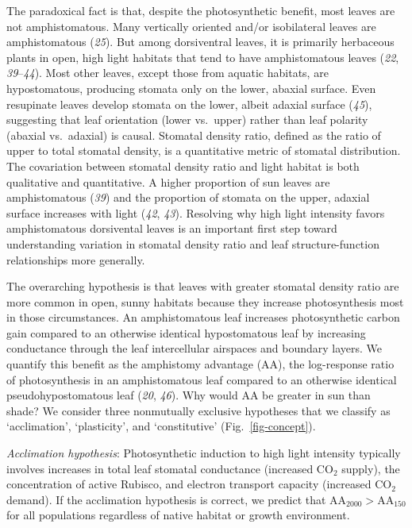 \documentclass[
  letterpaper,
  DIV=11,
  numbers=noendperiod]{scrartcl}
\newcommand{\aahigh}{\mathrm{AA}_{2000}}
\newcommand{\aalow}{\mathrm{AA}_{150}}
\newcommand{\aax}{$\mathrm{AA}$}
\begin{document}
The paradoxical fact is that, despite the photosynthetic benefit, most
leaves are not amphistomatous. Many vertically oriented and/or
isobilateral leaves are amphistomatous (\emph{25}). But among
dorsiventral leaves, it is primarily herbaceous plants in open, high
light habitats that tend to have amphistomatous leaves (\emph{22},
\emph{39}--\emph{44}). Most other leaves, except those from aquatic
habitats, are hypostomatous, producing stomata only on the lower,
abaxial surface. Even resupinate leaves develop stomata on the lower,
albeit adaxial surface (\emph{45}), suggesting that leaf orientation
(lower vs.~upper) rather than leaf polarity (abaxial vs.~adaxial) is
causal. Stomatal density ratio, defined as the ratio of upper to total
stomatal density, is a quantitative metric of stomatal distribution. The
covariation between stomatal density ratio and light habitat is both
qualitative and quantitative. A higher proportion of sun leaves are
amphistomatous (\emph{39}) and the proportion of stomata on the upper,
adaxial surface increases with light (\emph{42}, \emph{43}). Resolving
why high light intensity favors amphistomatous dorsivental leaves is an
important first step toward understanding variation in stomatal density
ratio and leaf structure-function relationships more generally.

The overarching hypothesis is that leaves with greater stomatal density
ratio are more common in open, sunny habitats because they increase
photosynthesis most in those circumstances. An amphistomatous leaf
increases photosynthetic carbon gain compared to an otherwise identical
hypostomatous leaf by increasing conductance through the leaf
intercellular airspaces and boundary layers. We quantify this benefit as
the amphistomy advantage (\aax{}), the log-response ratio of
photosynthesis in an amphistomatous leaf compared to an otherwise
identical pseudohypostomatous leaf (\emph{20}, \emph{46}). Why would
\aax{} be greater in sun than shade? We consider three nonmutually
exclusive hypotheses that we classify as `acclimation', `plasticity',
and `constitutive' (Fig.~\ref{fig-concept}).

\emph{Acclimation hypothesis}: Photosynthetic induction to high light
intensity typically involves increases in total leaf stomatal
conductance (increased CO\(_2\) supply), the concentration of active
Rubisco, and electron transport capacity (increased CO\(_2\) demand). If
the acclimation hypothesis is correct, we predict that
\(\aahigh{} > \aalow{}\) for all populations regardless of native
habitat or growth environment.
\end{document}

